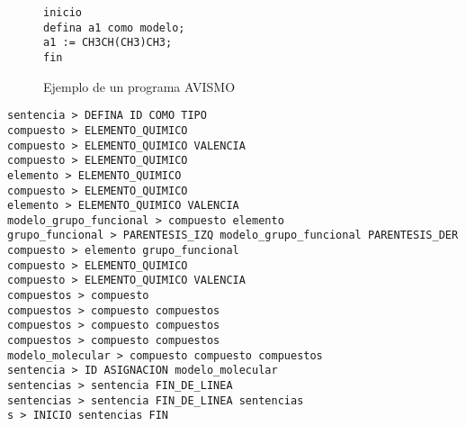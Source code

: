 \begin{figure}

	\begin{verbatim}
inicio 
defina a1 como modelo;
a1 := CH3CH(CH3)CH3;
fin
\end{verbatim}
	\caption{Ejemplo de un programa AVISMO}
	\label{fig: avismoProg}
\end{figure}

\begin{lstlisting}
sentencia > DEFINA ID COMO TIPO                                         
compuesto > ELEMENTO_QUIMICO                                            
compuesto > ELEMENTO_QUIMICO VALENCIA                                   
compuesto > ELEMENTO_QUIMICO                                            
elemento > ELEMENTO_QUIMICO                                             
compuesto > ELEMENTO_QUIMICO                                            
elemento > ELEMENTO_QUIMICO VALENCIA                                    
modelo_grupo_funcional > compuesto elemento                             
grupo_funcional > PARENTESIS_IZQ modelo_grupo_funcional PARENTESIS_DER  
compuesto > elemento grupo_funcional                                    
compuesto > ELEMENTO_QUIMICO                                            
compuesto > ELEMENTO_QUIMICO VALENCIA                                   
compuestos > compuesto                                                  
compuestos > compuesto compuestos                                       
compuestos > compuesto compuestos                                       
compuestos > compuesto compuestos                                       
modelo_molecular > compuesto compuesto compuestos                       
sentencia > ID ASIGNACION modelo_molecular                              
sentencias > sentencia FIN_DE_LINEA                                     
sentencias > sentencia FIN_DE_LINEA sentencias                          
s > INICIO sentencias FIN                                               
\end{lstlisting}


